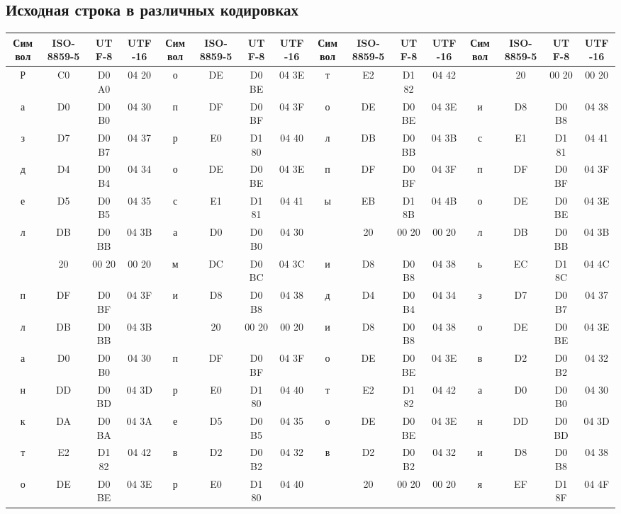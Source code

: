 \subsection{Исходная строка в различных кодировках}
\noindent\resizebox{17.8cm}{!} {
	\begin{center}
		\begin{tabular}{|c|c|c|c||c|c|c|c||c|c|c|c||c|c|c|c|}
			\hline
			Символ & ISO-8859-5 & UTF-8 & UTF-16 & Символ & ISO-8859-5 & UTF-8 & UTF-16 & Символ & ISO-8859-5 & UTF-8 & UTF-16 & Символ & ISO-8859-5 & UTF-8 & UTF-16\\
			\hline
			\hline
			Р & C0 & D0 A0 & 04 20 & о & DE & D0 BE & 04 3E & т & E2 & D1 82 & 04 42 &   & 20 & 00 20 & 00 20\\
			а & D0 & D0 B0 & 04 30 & п & DF & D0 BF & 04 3F & о & DE & D0 BE & 04 3E & и & D8 & D0 B8 & 04 38\\
			з & D7 & D0 B7 & 04 37 & р & E0 & D1 80 & 04 40 & л & DB & D0 BB & 04 3B & с & E1 & D1 81 & 04 41\\
			д & D4 & D0 B4 & 04 34 & о & DE & D0 BE & 04 3E & п & DF & D0 BF & 04 3F & п & DF & D0 BF & 04 3F\\
			е & D5 & D0 B5 & 04 35 & с & E1 & D1 81 & 04 41 & ы & EB & D1 8B & 04 4B & о & DE & D0 BE & 04 3E\\
			л & DB & D0 BB & 04 3B & а & D0 & D0 B0 & 04 30 &   & 20 & 00 20 & 00 20 & л & DB & D0 BB & 04 3B\\
			& 20 & 00 20 & 00 20 & м & DC & D0 BC & 04 3C & и & D8 & D0 B8 & 04 38 & ь & EC & D1 8C & 04 4C\\
			п & DF & D0 BF & 04 3F & и & D8 & D0 B8 & 04 38 & д & D4 & D0 B4 & 04 34 & з & D7 & D0 B7 & 04 37\\
			л & DB & D0 BB & 04 3B &   & 20 & 00 20 & 00 20 & и & D8 & D0 B8 & 04 38 & о & DE & D0 BE & 04 3E\\
			а & D0 & D0 B0 & 04 30 & п & DF & D0 BF & 04 3F & о & DE & D0 BE & 04 3E & в & D2 & D0 B2 & 04 32\\
			н & DD & D0 BD & 04 3D & р & E0 & D1 80 & 04 40 & т & E2 & D1 82 & 04 42 & а & D0 & D0 B0 & 04 30\\
			к & DA & D0 BA & 04 3A & е & D5 & D0 B5 & 04 35 & о & DE & D0 BE & 04 3E & н & DD & D0 BD & 04 3D\\
			т & E2 & D1 82 & 04 42 & в & D2 & D0 B2 & 04 32 & в & D2 & D0 B2 & 04 32 & и & D8 & D0 B8 & 04 38\\
			о & DE & D0 BE & 04 3E & р & E0 & D1 80 & 04 40 &   & 20 & 00 20 & 00 20 & я & EF & D1 8F & 04 4F\\

\end{tabular}
\end{center}}
